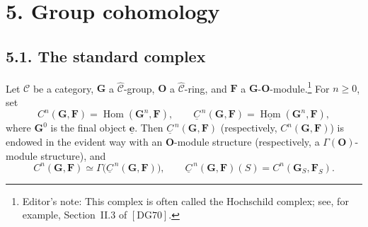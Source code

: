 
\section*{5. Group cohomology}

\subsection*{5.1. The standard complex}

Let \(\mathscr C\) be a category, \(\mathbf G\) a
\(\widehat{\mathscr C}\)-group, \(\mathbf O\) a
\(\widehat{\mathscr C}\)-ring, and \(\mathbf F\) a
\(\mathbf G\)-\(\mathbf O\)-module.\footnote{Editor's note: This complex
is often called the Hochschild complex; see, for example, Section~II.3 of
\([\mathrm{DG}70]\).} For \(n\geq 0\), set
\[
  C^n(\mathbf G,\mathbf F)
    =\operatorname{Hom}(\mathbf G^n,\mathbf F),
  \qquad
  \underline C^{\,n}(\mathbf G,\mathbf F)
    =\underline{\operatorname{Hom}}(\mathbf G^n,\mathbf F),
\]
where \(\mathbf G^0\) is the final object \(\underline{\mathbf e}\).
Then \(\underline C^{\,n}(\mathbf G,\mathbf F)\) (respectively,
\(C^n(\mathbf G,\mathbf F)\)) is endowed in the evident way with an
\(\mathbf O\)-module structure (respectively, a
\(\Gamma(\mathbf O)\)-module structure), and
\[
  C^n(\mathbf G,\mathbf F)
    \simeq \Gamma\bigl(\underline C^{\,n}(\mathbf G,\mathbf F)\bigr),
  \qquad
  \underline C^{\,n}(\mathbf G,\mathbf F)(S)
    =C^n(\mathbf G_S,\mathbf F_S).
\]

